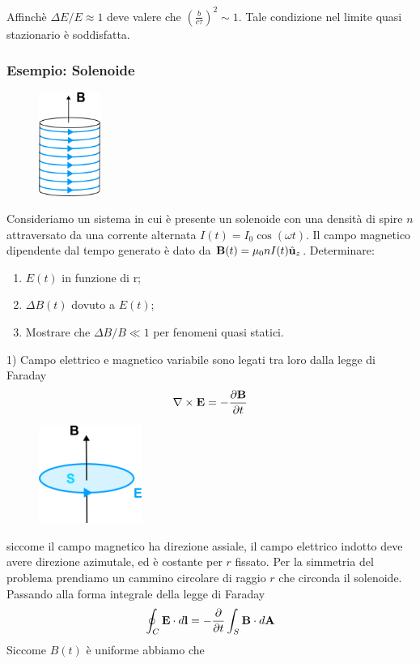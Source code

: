 Affinch\`e $\Delta E/E \approx1$ deve valere che $\left(\frac{b}{c \tau}\right)^2 \sim 1$. Tale condizione nel limite quasi stazionario \`e soddisfatta.

\subsubsection{Esempio: Solenoide }

\begin{figure} %
    \centering
    \includegraphics[width=0.18\textwidth]{images/solenoid2} %
\end{figure}
Consideriamo un sistema in cui \`e presente un solenoide con una densit\`a di spire $n$ attraversato da una corrente alternata $I(t) = I_0 \cos(\omega t)$. Il campo magnetico dipendente dal tempo generato \`e dato da $\bold{B}(t) = \mu_0 n I(t) \hat{\bold{u}}_z$. Determinare:
\begin{enumerate}
	\item  $E(t)$ in funzione di r;
	\item $\Delta B(t)$ dovuto a $E(t)$;
	\item Mostrare che $\Delta B /B \ll 1$ per fenomeni quasi statici.
\end{enumerate}



1)  Campo elettrico e magnetico variabile sono legati tra loro dalla legge di Faraday
\begin{equation*}
	\nabla \times \bold{E} = - \frac{\partial \bold{B}}{\partial t}
\end{equation*}
\begin{figure} %
    \centering
    \includegraphics[width=0.3\textwidth]{images/circular_path} %
\end{figure}
siccome il campo magnetico ha direzione assiale, il campo elettrico indotto deve avere direzione azimutale, ed \`e costante per $r$ fissato. Per la simmetria del problema prendiamo un cammino circolare di raggio $r$ che circonda il solenoide. Passando alla forma integrale della legge di Faraday
\begin{equation*}
	\oint_{C} \bold{E} \cdot d \bold{l} = - \frac{\partial}{\partial t} \int_{S} \bold{B} \cdot d\bold{A}
\end{equation*} 
Siccome $B(t)$ \`e uniforme abbiamo che 

